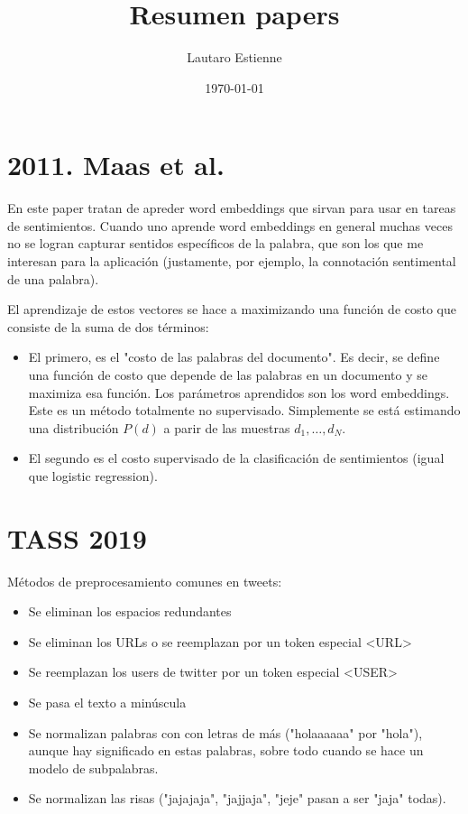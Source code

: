 \documentclass[11pt]{article}
\title{Resumen papers}
\author{ Lautaro Estienne}
\date{\today}
\begin{document}
\maketitle	



\section{2011. Maas et al.}

En este paper tratan de apreder word embeddings que sirvan para usar en tareas de sentimientos. Cuando uno aprende word embeddings en general muchas veces no se logran capturar sentidos específicos de la palabra, que son los que me interesan para la aplicación (justamente, por ejemplo, la connotación sentimental de una palabra).

El aprendizaje de estos vectores se hace a maximizando una función de costo que consiste de la suma de dos términos: 
\begin{itemize}
\item El primero, es el "costo de las palabras del documento". Es decir, se define una función de costo que depende de las palabras en un documento y se maximiza esa función. Los parámetros aprendidos son los word embeddings. Este es un método totalmente no supervisado. Simplemente se está estimando una distribución $P(d)$ a parir de las muestras $d_1,\ldots,d_N$.

\item El segundo es el costo supervisado de la clasificación de sentimientos (igual que logistic regression).
\end{itemize}

\section{TASS 2019}

Métodos de preprocesamiento comunes en tweets:

\begin{itemize}
\item Se eliminan los espacios redundantes
\item Se eliminan los URLs o se reemplazan por un token especial <URL>
\item Se reemplazan los users de twitter por un token especial <USER>
\item Se pasa el texto a minúscula
\item Se normalizan palabras con con letras de más ("holaaaaaa" por "hola"), aunque hay significado en estas palabras, sobre todo cuando se hace un modelo de subpalabras.
\item Se normalizan las risas ("jajajaja", "jajjaja", "jeje" pasan a ser "jaja" todas).
\end{itemize}


\end{document}
